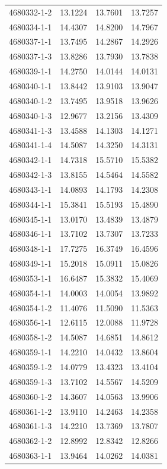 \begin{longtable}{lrrr}
4680332-1-2 & 13.1224 & 13.7601 & 13.7257 \\
4680334-1-1 & 14.4307 & 14.8200 & 14.7967 \\
4680337-1-1 & 13.7495 & 14.2867 & 14.2926 \\
4680337-1-3 & 13.8286 & 13.7930 & 13.7838 \\
4680339-1-1 & 14.2750 & 14.0144 & 14.0131 \\
4680340-1-1 & 13.8442 & 13.9103 & 13.9047 \\
4680340-1-2 & 13.7495 & 13.9518 & 13.9626 \\
4680340-1-3 & 12.9677 & 13.2156 & 13.4309 \\
4680341-1-3 & 13.4588 & 14.1303 & 14.1271 \\
4680341-1-4 & 14.5087 & 14.3250 & 14.3131 \\
4680342-1-1 & 14.7318 & 15.5710 & 15.5382 \\
4680342-1-3 & 13.8155 & 14.5464 & 14.5582 \\
4680343-1-1 & 14.0893 & 14.1793 & 14.2308 \\
4680344-1-1 & 15.3841 & 15.5193 & 15.4890 \\
4680345-1-1 & 13.0170 & 13.4839 & 13.4879 \\
4680346-1-1 & 13.7102 & 13.7307 & 13.7233 \\
4680348-1-1 & 17.7275 & 16.3749 & 16.4596 \\
4680349-1-1 & 15.2018 & 15.0911 & 15.0826 \\
4680353-1-1 & 16.6487 & 15.3832 & 15.4069 \\
4680354-1-1 & 14.0003 & 14.0054 & 13.9892 \\
4680354-1-2 & 11.4076 & 11.5090 & 11.5363 \\
4680356-1-1 & 12.6115 & 12.0088 & 11.9728 \\
4680358-1-2 & 14.5087 & 14.6851 & 14.8612 \\
4680359-1-1 & 14.2210 & 14.0432 & 13.8604 \\
4680359-1-2 & 14.0779 & 13.4323 & 13.4104 \\
4680359-1-3 & 13.7102 & 14.5567 & 14.5209 \\
4680360-1-2 & 14.3607 & 14.0563 & 13.9906 \\
4680361-1-2 & 13.9110 & 14.2463 & 14.2358 \\
4680361-1-3 & 14.2210 & 13.7369 & 13.7807 \\
4680362-1-2 & 12.8992 & 12.8342 & 12.8266 \\
4680363-1-1 & 13.9464 & 14.0262 & 14.0381 \\

\end{longtable}
